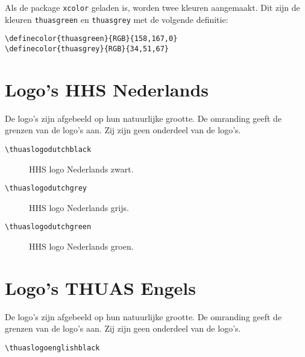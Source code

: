 \documentclass[a4paper,12pt]{article}
\begin{document}
Als de package \verb|xcolor| geladen is, worden twee kleuren aangemaakt. Dit zijn
de kleuren \verb|thuasgreen| en \verb|thuasgrey| met de volgende definitie:

\begin{verbatim}
\definecolor{thuasgreen}{RGB}{158,167,0}
\definecolor{thuasgrey}{RGB}{34,51,67}
\end{verbatim}


\section{Logo's HHS Nederlands}
De logo's zijn afgebeeld op hun natuurlijke grootte. De omranding geeft de
grenzen van de logo's aan. Zij zijn geen onderdeel van de logo's.

\begin{verbatim}
\thuaslogodutchblack
\end{verbatim}

\begin{figure}[H]
\centering\fboxsep=0pt%
\fbox{%
\thuaslogodutchblack}
\caption{HHS logo Nederlands zwart.}
\end{figure}

\begin{verbatim}
\thuaslogodutchgrey
\end{verbatim}

\begin{figure}[H]
\centering\fboxsep=0pt%
\fbox{%
\thuaslogodutchgrey}
\caption{HHS logo Nederlands grijs.}
\end{figure}

\begin{verbatim}
\thuaslogodutchgreen
\end{verbatim}

\begin{figure}[H]
\centering\fboxsep=0pt%
\fbox{%
\thuaslogodutchgreen}
\caption{HHS logo Nederlands groen.}
\end{figure}


\section{Logo's THUAS Engels}
De logo's zijn afgebeeld op hun natuurlijke grootte. De omranding geeft de
grenzen van de logo's aan. Zij zijn geen onderdeel van de logo's.

\begin{verbatim}
\thuaslogoenglishblack
\end{verbatim}
\end{document}
